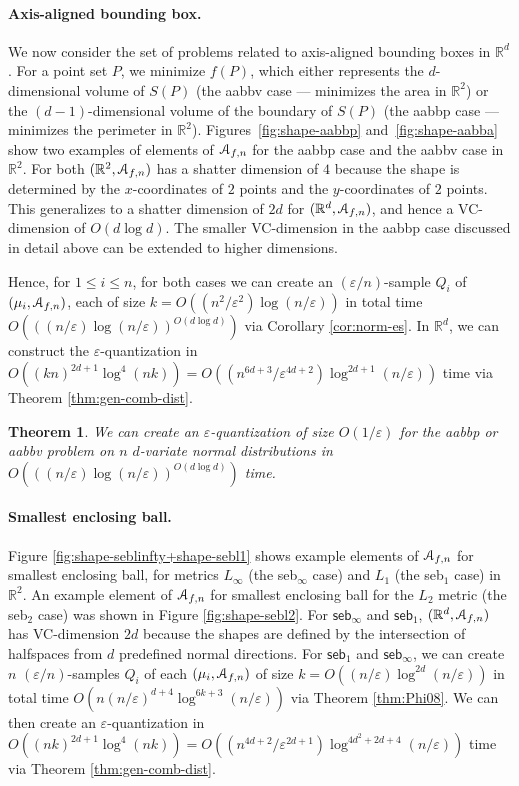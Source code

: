 \documentclass{journal}
\newcommand{\eps}{\varepsilon}
\newcommand{\Eu}[1]{\ensuremath{\EuScript{#1}}}
\newcommand{\R}{\ensuremath{\mathbb{R}}}
\newtheorem {theorem}{Theorem}[section]
\begin{document}
\paragraph{Axis-aligned bounding box.}
We now consider the set of problems related to axis-aligned bounding boxes in $\R^d$.  For a point set $P$, we minimize $f(P)$, which either represents the $d$-dimensional volume of $S(P)$ (the \textsf{aabbv} case --- minimizes the area in $\R^2$) or the $(d-1)$-dimensional volume of the boundary of $S(P)$ (the \textsf{aabbp} case --- minimizes the perimeter in $\R^2$).
      Figures~\ref{fig:shape-aabbp} and~\ref {fig:shape-aabba} show two examples of elements of $\Eu{A}_{f,n}$ for the \textsf{aabbp} case and the \textsf{aabbv} case in $\R^2$.  For both $(\R^2, \Eu{A}_{f,n})$ has a shatter dimension of $4$ because the shape is determined by the $x$-coordinates of $2$ points and the $y$-coordinates of $2$ points.  This generalizes to a shatter dimension of $2d$ for $(\R^d, \Eu{A}_{f,n})$, and hence a VC-dimension of $O(d \log d)$.  The smaller VC-dimension in the \textsf{aabbp} case discussed in detail above can be extended to higher dimensions.



Hence, for $1 \leq i \leq n$,  for both cases we can create an $(\eps/n)$-sample $Q_i$ of $(\mu_i, \Eu{A}_{f,n})$, each of size $k = O((n^2/\eps^2) \log (n/\eps))$ in total time $O(((n/\eps) \log (n/\eps))^{O(d \log d)})$ via Corollary \ref{cor:norm-es}.
In $\R^d$, we can construct the $\eps$-quantization in
$O((kn)^{2d+1} \log^4 (nk)) = O((n^{6d+3}/\eps^{4d+2}) \log^{2d+1} (n/\eps))$ time via Theorem \ref{thm:gen-comb-dist}.

\begin{theorem}
We can create an $\eps$-quantization of size $O(1/\eps)$ for the \textsf{aabbp} or \textsf{aabbv} problem on $n$ $d$-variate normal distributions in $O(((n/\eps) \log (n/\eps))^{O(d \log d)})$ time.
\end{theorem}


\paragraph{Smallest enclosing ball.}
Figure \ref{fig:shape-seblinfty+shape-sebl1} shows example elements of $\Eu{A}_{f,n}$ for smallest enclosing ball, for metrics $L_\infty$ (the \textsf{seb}$_{\infty}$ case) and $L_1$ (the \textsf{seb}$_1$ case) in $\R^2$.  An example element of $\Eu{A}_{f,n}$ for smallest enclosing ball for the $L_2$ metric (the \textsf{seb}$_2$ case) was shown in Figure \ref{fig:shape-sebl2}.  For $\textsf{seb}_\infty$ and $\textsf{seb}_1$, $(\R^d, \Eu{A}_{f,n})$ has VC-dimension $2d$ because the shapes are defined by the intersection of halfspaces from $d$ predefined normal directions.
For $\textsf{seb}_1$ and $\textsf{seb}_\infty$, we can create $n$ $(\eps/n)$-samples $Q_i$ of each $(\mu_i, \Eu{A}_{f,n})$ of size $k = O((n/\eps) \log^{2d} (n/\eps))$ in total time $O(n (n/\eps)^{d+4} \log^{6k + 3} (n/\eps))$ via Theorem \ref{thm:Phi08}.
We can then create an $\eps$-quantization in $O((nk)^{2d+1} \log^4 (nk)) = O((n^{4d+2}/\eps^{2d+1} )\log^{4d^2 + 2d + 4} (n/\eps))$ time via Theorem \ref{thm:gen-comb-dist}.
\end{document}
